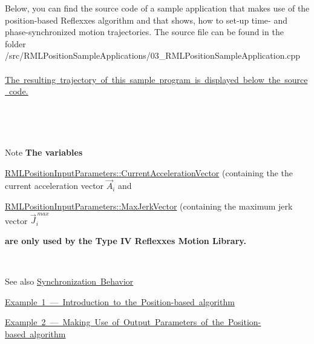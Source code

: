Below, you can find the source code of a sample application that makes use of the position-\/based Reflexxes algorithm and that shows, how to set-\/up time-\/ and phase-\/synchronized motion trajectories. The source file can be found in the folder~\newline
~\newline
{\ttfamily /src/\+R\+M\+L\+Position\+Sample\+Applications/03\+\_\+\+R\+M\+L\+Position\+Sample\+Application.cpp}~\newline
~\newline
\mbox{\hyperlink{page_Code_03_RMLPositionSampleApplication_anc_PositionExample3}{The resulting trajectory of this sample program is displayed below the source code.}} ~\newline
~\newline
 
\begin{DoxyCodeInclude}{0}
\end{DoxyCodeInclude}


~\newline
~\newline
\label{page_Code_03_RMLPositionSampleApplication_anc_PositionExample3}%
%
 

~\newline
 \begin{DoxyNote}{Note}
{\bfseries{The variables}}~\newline
~\newline

\begin{DoxyItemize}
\item \mbox{\hyperlink{classRMLInputParameters_a423bf4b1ef337cbf6eee22fe2e2502c1}{R\+M\+L\+Position\+Input\+Parameters\+::\+Current\+Acceleration\+Vector}} (containing the the current acceleration vector $ \vec{A}_i$ and~\newline
~\newline
 
\item \mbox{\hyperlink{classRMLInputParameters_a5968ce643868260410f149996c446b66}{R\+M\+L\+Position\+Input\+Parameters\+::\+Max\+Jerk\+Vector}} (containing the maximum jerk vector $ \vec{J}_i^{\,max} $ ~\newline
~\newline
 
\end{DoxyItemize}{\bfseries{are only used by the Type IV Reflexxes Motion Library.}}
\end{DoxyNote}
~\newline
~\newline
 \begin{DoxySeeAlso}{See also}
\mbox{\hyperlink{page_SynchronizationBehavior}{Synchronization Behavior}} 

\mbox{\hyperlink{page_Code_01_RMLPositionSampleApplication}{Example 1 --- Introduction to the Position-\/based algorithm}} 

\mbox{\hyperlink{page_Code_02_RMLPositionSampleApplication}{Example 2 --- Making Use of Output Parameters of the Position-\/based algorithm}} 
\end{DoxySeeAlso}
